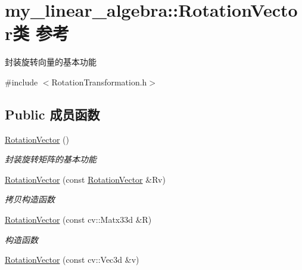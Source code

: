 \hypertarget{classmy__linear__algebra_1_1_rotation_vector}{}\section{my\+\_\+linear\+\_\+algebra\+::Rotation\+Vector类 参考}
\label{classmy__linear__algebra_1_1_rotation_vector}


封装旋转向量的基本功能  




{\ttfamily \#include $<$Rotation\+Transformation.\+h$>$}

\subsection*{Public 成员函数}
\begin{DoxyCompactItemize}
\item 
\mbox{\label{classmy__linear__algebra_1_1_rotation_vector_ae8d5dbd52358a64899d22ff01b5bec25}} 
\mbox{\hyperlink{classmy__linear__algebra_1_1_rotation_vector_ae8d5dbd52358a64899d22ff01b5bec25}{Rotation\+Vector}} ()
\begin{DoxyCompactList}\small\item\em 封装旋转矩阵的基本功能 \end{DoxyCompactList}\item 
\mbox{\label{classmy__linear__algebra_1_1_rotation_vector_a548eb7ebc057e4044360bcfd9efa7685}} 
\mbox{\hyperlink{classmy__linear__algebra_1_1_rotation_vector_a548eb7ebc057e4044360bcfd9efa7685}{Rotation\+Vector}} (const \mbox{\hyperlink{classmy__linear__algebra_1_1_rotation_vector}{Rotation\+Vector}} \&Rv)
\begin{DoxyCompactList}\small\item\em 拷贝构造函数 \end{DoxyCompactList}\item 
\mbox{\hyperlink{classmy__linear__algebra_1_1_rotation_vector_ab5b56cdee5d68bb5a5c0610d6294d21f}{Rotation\+Vector}} (const cv\+::\+Matx33d \&R)
\begin{DoxyCompactList}\small\item\em 构造函数 \end{DoxyCompactList}\item 
\mbox{\hyperlink{classmy__linear__algebra_1_1_rotation_vector_a130d4aa26657b6c29465f24dffdde3e6}{Rotation\+Vector}} (const cv\+::\+Vec3d \&v)

\end{DoxyCompactItemize}
